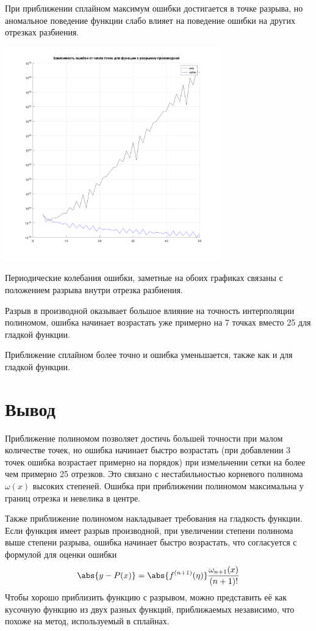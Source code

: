 \documentclass[a4paper]{article}
\begin{document}
При приближении сплайном максимум ошибки достигается в точке разрыва, но аномальное поведение функции слабо влияет на
поведение ошибки на других отрезках разбиения.
\begin{center}
\includegraphics[width=0.7\textwidth]{err(k).png}
\end{center}

Периодические колебания ошибки, заметные на обоих графиках связаны с положением разрыва внутри отрезка разбиения.

Разрыв в производной оказывает большое влияние на точность интерполяции полиномом, ошибка начинает возрастать уже
примерно на 7 точках вместо 25 для гладкой функции.

Приближение сплайном более точно и ошибка уменьшается, также как и для гладкой функции.

\section{Вывод}\label{sec:res}
Приближение полиномом позволяет достичь большей точности при малом количестве точек, но ошибка начинает быстро
возрастать (при добавлении 3 точек ошибка возрастает примерно на порядок) при измельчении сетки на более чем примерно 25
отрезков. Это связано с нестабильностью корневого полинома \(\omega(x)\) высоких степеней.
Ошибка при приближении полиномом максимальна у границ отрезка и невелика в центре.

Также приближение полиномом накладывает требования на гладкость функции. Если функция имеет разрыв производной, при
увеличении степени полинома выше степени разрыва, ошибка начинает быстро возрастать, что согласуется с формулой для
оценки ошибки \[
  \abs{y - P(x)} = \abs{f^{(n+1)}(\eta)} \frac{\omega_{n+1}(x)}{(n+1)!}
\]
Чтобы хорошо приблизить функцию с разрывом, можно представить её как кусочную функцию из двух разных функций, приближаемых
независимо, что похоже на метод, используемый в сплайнах.
\end{document}
